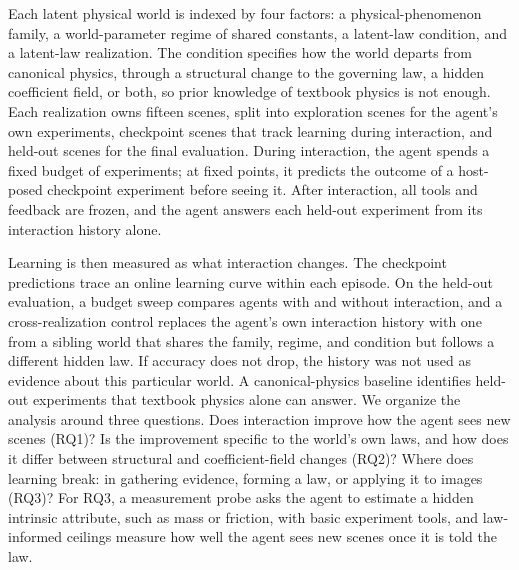 Each latent physical world is indexed by four factors: a physical-phenomenon family, a world-parameter regime of shared constants, a latent-law condition, and a latent-law realization. The condition specifies how the world departs from canonical physics, through a structural change to the governing law, a hidden coefficient field, or both, so prior knowledge of textbook physics is not enough. Each realization owns fifteen scenes, split into exploration scenes for the agent's own experiments, checkpoint scenes that track learning during interaction, and held-out scenes for the final evaluation. During interaction, the agent spends a fixed budget of experiments; at fixed points, it predicts the outcome of a host-posed checkpoint experiment before seeing it. After interaction, all tools and feedback are frozen, and the agent answers each held-out experiment from its interaction history alone.

Learning is then measured as what interaction changes. The checkpoint predictions trace an online learning curve within each episode. On the held-out evaluation, a budget sweep compares agents with and without interaction, and a cross-realization control replaces the agent's own interaction history with one from a sibling world that shares the family, regime, and condition but follows a different hidden law. If accuracy does not drop, the history was not used as evidence about this particular world. A canonical-physics baseline identifies held-out experiments that textbook physics alone can answer. We organize the analysis around three questions. Does interaction improve how the agent sees new scenes (RQ1)? Is the improvement specific to the world's own laws, and how does it differ between structural and coefficient-field changes (RQ2)? Where does learning break: in gathering evidence, forming a law, or applying it to images (RQ3)? For RQ3, a measurement probe asks the agent to estimate a hidden intrinsic attribute, such as mass or friction, with basic experiment tools, and law-informed ceilings measure how well the agent sees new scenes once it is told the law.

